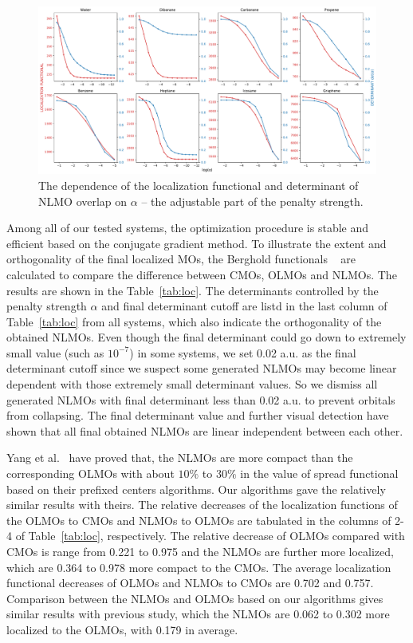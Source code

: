 \documentclass[aps,prl,reprint,amsmath,amssymb]{revtex4-1}
\begin{document}
\begin{figure}[hbpt]
\centering
\includegraphics[width=\textwidth]{figure_2.pdf}
\caption{The dependence of the localization functional and determinant of NLMO overlap on $\alpha$ -- the adjustable part of the penalty strength.}
\label{fig:alpha}
\end{figure}


Among all of our tested systems, the optimization procedure is stable and efficient based on the conjugate gradient method. 
To illustrate the extent and orthogonality of the final localized MOs, the Berghold functionals ~\cite{berghold2000general}  are calculated to compare the difference between CMOs, OLMOs and NLMOs.
The results are shown in the Table~\ref{tab:loc}.
The determinants controlled by the penalty strength $\alpha$ and final determinant cutoff are listd in the last column of Table~\ref{tab:loc} from all systems, which also indicate the orthogonality of the obtained NLMOs.
Even though the final determinant could go down to extremely small value (such as $10^{-7}$) in some systems, we set 0.02 a.u. as the final determinant cutoff since we suspect some generated NLMOs may become linear dependent with those extremely small determinant values.
So we dismiss all generated NLMOs with final determinant less than 0.02 a.u. to prevent orbitals from collapsing.
The final determinant value and further visual detection have shown that all final obtained NLMOs are linear independent between each other.

Yang et al.~\cite{feng2004An_efficient, cui2010efficient} have proved that, the NLMOs are more compact than the corresponding OLMOs with about $10\%$ to $30\%$ in the value of spread functional based on their prefixed centers algorithms.
Our algorithms gave the relatively similar results with theirs.
The relative decreases of the localization functions of the OLMOs to CMOs and NLMOs to OLMOs are tabulated in the columns of 2-4 of Table~\ref{tab:loc}, respectively.
The relative decrease of OLMOs compared with CMOs is range from 0.221 to 0.975 and the NLMOs are further  more localized, which are 0.364 to 0.978 more compact to the CMOs.
The average  localization functional decreases of OLMOs and NLMOs to CMOs are 0.702 and 0.757.
Comparison between the NLMOs and OLMOs based on our algorithms gives similar results with previous study, which the NLMOs are 0.062 to 0.302 more localized to the OLMOs, with 0.179 in average.
\end{document}
